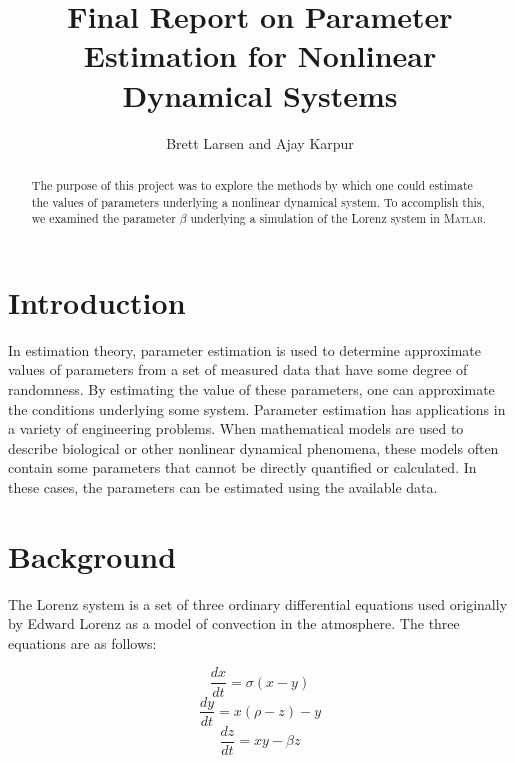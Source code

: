 \documentclass{article}[11pt]
\title{Final Report on Parameter Estimation for Nonlinear Dynamical Systems}
\author{Brett Larsen and Ajay Karpur}
\date{}
\newcommand{\Matlab}{\textsc{Matlab}}
\begin{document}
\maketitle
\doublespace


\begin{abstract}
The purpose of this project was to explore the methods by which one could estimate the values of parameters underlying a nonlinear dynamical system. To accomplish this, we examined the parameter $\beta$ underlying a simulation of the Lorenz system in \Matlab.
\end{abstract}

\section{Introduction}
\label{sec:intro}
In estimation theory, parameter estimation is used to determine approximate values of parameters from a set of measured data that have some degree of randomness. By estimating the value of these parameters, one can approximate the conditions underlying some system. Parameter estimation has applications in a variety of engineering problems. When mathematical models are used to describe biological or other nonlinear dynamical phenomena, these models often contain some parameters that cannot be directly quantified or calculated. In these cases, the parameters can be estimated using the available data.



\section{Background}
\label{sec:intro}
The Lorenz system is a set of three ordinary differential equations used originally by Edward Lorenz as a model of convection in the atmosphere.  The three equations are as follows:

\begin{equation}
	\frac{dx}{dt} = \sigma (x - y)
\end{equation}
\begin{equation}
	\frac{dy}{dt} = x (\rho - z) - y
\end{equation}
\begin{equation}
	\frac{dz}{dt} = xy - \beta z
\end{equation}
\end{document}
